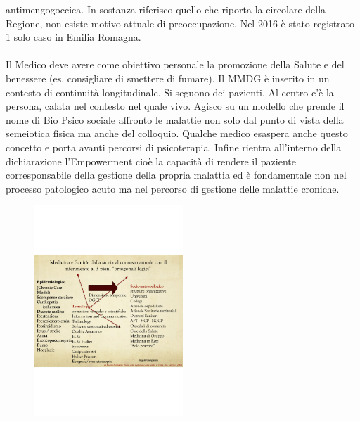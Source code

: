 antimengogoccica. In sostanza riferisco quello che riporta la circolare
della Regione, non esiste motivo attuale di preoccupazione. Nel 2016 è
stato registrato 1 solo caso in Emilia Romagna.
\\\\
Il Medico deve avere come obiettivo personale la promozione della Salute
e del benessere (es. consigliare di smettere di fumare). Il MMDG è
inserito in un contesto di continuità longitudinale. Si seguono dei
pazienti. Al centro c'è la persona, calata nel contesto nel quale vivo.
Agisco su un modello che prende il nome di Bio Psico sociale affronto le
malattie non solo dal punto di vista della semeiotica fisica ma anche
del colloquio. Qualche medico esaspera anche questo concetto e porta
avanti percorsi di psicoterapia. Infine rientra all'interno della
dichiarazione l'Empowerment cioè la capacità di rendere il paziente
corresponsabile della gestione della propria malattia ed è fondamentale
non nel processo patologico acuto ma nel percorso di gestione delle
malattie croniche.

\begin{figure}[!ht]
\centering
	\includegraphics[width=0.5\textwidth]{38/image9.png}
	\end{figure}
	
